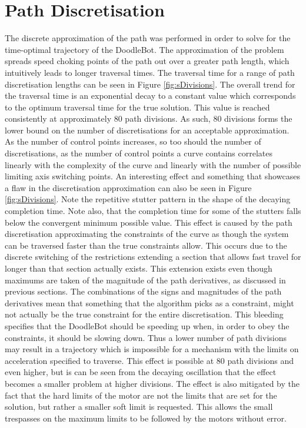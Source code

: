 \section{Path Discretisation}
The discrete approximation of the path was performed in order to solve for the time-optimal trajectory of the DoodleBot. The approximation of the problem spreads speed choking points of the path out over a greater path length, which intuitively leads to longer traversal times. The traversal time for a range of path discretisation lengths can be seen in Figure \ref{fig:sDivisions}. The overall trend for the traversal time is an exponential decay to a constant value which corresponds to the optimum traversal time for the true solution. This value is reached consistently at approximately 80 path divisions. As such, 80 divisions forms the lower bound on the number of discretisations for an acceptable approximation. As the number of control points increases, so too should the number of discretisations, as the number of control points a curve contains correlates linearly with the complexity of the curve and linearly with the number of possible limiting axis switching points.
An interesting effect and something that showcases a flaw in the discretisation approximation can also be seen in Figure \ref{fig:sDivisions}. Note the repetitive stutter pattern in the shape of the decaying completion time. Note also, that the completion time for some of the stutters falls below the convergent minimum possible value. This effect is caused by the path discretisation approximating the constraints of the curve as though the system can be traversed faster than the true constraints allow. This occurs due to the discrete switching of the restrictions extending a section that allows fast travel for longer than that section actually exists. This extension exists even though maximums are taken of the magnitude of the path derivatives, as discussed in previous sections. The combinations of the signs and magnitudes of the path derivatives mean that something that the algorithm picks as a constraint, might not actually be the true constraint for the entire discretisation. This bleeding specifies that the DoodleBot should be speeding up when, in order to obey the constraints, it should be slowing down. Thus a lower number of path divisions may result in a trajectory which is impossible for a mechanism with the limits on acceleration specified to traverse. This effect is possible at 80 path divisions and even higher, but is can be seen from the decaying oscillation that the effect becomes a smaller problem at higher divisions. The effect is also mitigated by the fact that the hard limits of the motor are not the limits that are set for the solution, but rather a smaller soft limit is requested. This allows the small trespasses on the maximum limits to be followed by the motors without error.


